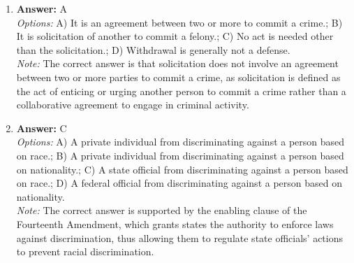 \documentclass[12pt]{article}
\begin{document}
\begin{enumerate}[label=\arabic*.]
\item \textbf{Answer:} A
\\ \textit{Options:} A) It is an agreement between two or more to commit a crime.; B) It is solicitation of another to commit a felony.; C) No act is needed other than the solicitation.; D) Withdrawal is generally not a defense.
\\ \textit{Note:} The correct answer is that solicitation does not involve an agreement between two or more parties to commit a crime, as solicitation is defined as the act of enticing or urging another person to commit a crime rather than a collaborative agreement to engage in criminal activity.
\item \textbf{Answer:} C
\\ \textit{Options:} A) A private individual from discriminating against a person based on race.; B) A private individual from discriminating against a person based on nationality.; C) A state official from discriminating against a person based on race.; D) A federal official from discriminating against a person based on nationality.
\\ \textit{Note:} The correct answer is supported by the enabling clause of the Fourteenth Amendment, which grants states the authority to enforce laws against discrimination, thus allowing them to regulate state officials' actions to prevent racial discrimination.
\end{enumerate}
\end{document}

